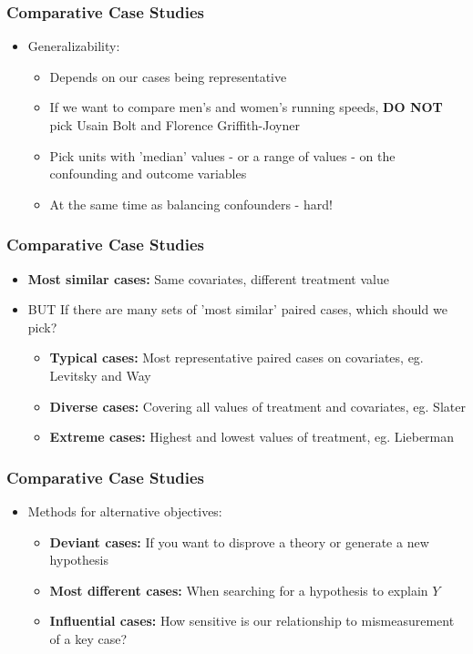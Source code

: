 \documentclass[xcolor=x11names,compress]{beamer}\usepackage[]{graphicx}\usepackage[]{color}
\renewcommand{\(}{\begin{columns}}
\renewcommand{\)}{\end{columns}}
\newcommand{\<}[1]{\begin{column}{#1}}
\renewcommand{\>}{\end{column}}
\begin{document}
\begin{frame}
\frametitle{Comparative Case Studies}
\begin{itemize}
\item Generalizability:
\pause
\begin{itemize}
\item Depends on our cases being representative
\pause
\item If we want to compare men's and women's running speeds, \textbf{DO NOT} pick Usain Bolt and Florence Griffith-Joyner
\pause
\item Pick units with 'median' values - or a range of values - on the confounding and outcome variables
\pause
\item At the same time as balancing confounders - hard!
\end{itemize}
\end{itemize}
\end{frame}

\begin{frame}
\frametitle{Comparative Case Studies}
\begin{itemize}
\item \textbf{Most similar cases:} Same covariates, different treatment value
\pause
\item BUT If there are many sets of 'most similar' paired cases, which should we pick?
\pause
\begin{itemize}
\item \textbf{Typical cases:} Most representative paired cases on covariates, eg. Levitsky and Way
\pause
\item \textbf{Diverse cases:} Covering all values of treatment and covariates, eg. Slater
\pause
\item \textbf{Extreme cases:} Highest and lowest values of treatment, eg. Lieberman
\end{itemize}
\end{itemize}
\end{frame}

\begin{frame}
\frametitle{Comparative Case Studies}
\begin{itemize}
\item Methods for alternative objectives:
\pause
\begin{itemize}
\item \textbf{Deviant cases:} If you want to disprove a theory or generate a new hypothesis
\pause
\item \textbf{Most different cases:} When searching for a hypothesis to explain $Y$
\pause
\item \textbf{Influential cases:} How sensitive is our relationship to mismeasurement of a key case?
\end{itemize}
\end{itemize}
\end{frame}
\end{document}
